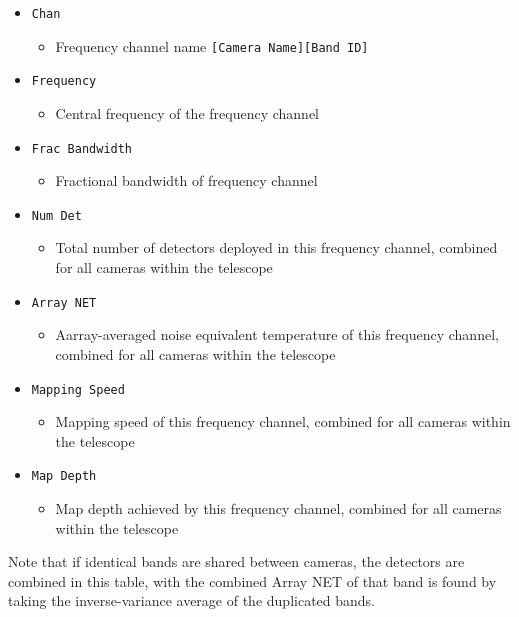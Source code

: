 \documentclass[11pt]{article} %
\begin{document}
\begin{itemize}[noitemsep,topsep=0pt]
	\item \texttt{Chan}
		\begin{itemize}[noitemsep,topsep=0pt]
		\item Frequency channel name \texttt{[Camera Name][Band ID]}
		\end{itemize}
	\item \texttt{Frequency}
		\begin{itemize}[noitemsep,topsep=0pt]
		\item Central frequency of the frequency channel
		\end{itemize}
	\item \texttt{Frac Bandwidth} 
		\begin{itemize}[noitemsep,topsep=0pt]
		\item Fractional bandwidth of frequency channel
		\end{itemize}
	\item \texttt{Num Det}
		\begin{itemize}[noitemsep,topsep=0pt]
		\item Total number of detectors deployed in this frequency channel, combined for all cameras within the telescope
		\end{itemize}
	\item \texttt{Array NET}
		\begin{itemize}[noitemsep,topsep=0pt]
		\item Aarray-averaged noise equivalent temperature of this frequency channel, combined for all cameras within the telescope
		\end{itemize}
	\item \texttt{Mapping Speed}
		\begin{itemize}[noitemsep,topsep=0pt]	
		\item Mapping speed of this frequency channel, combined for all cameras within the telescope
		\end{itemize}
	\item \texttt{Map Depth}
		\begin{itemize}[noitemsep,topsep=0pt]
		\item Map depth achieved by this frequency channel, combined for all cameras within the telescope
		\end{itemize}
\end{itemize}
Note that if identical bands are shared between cameras, the detectors are combined in this table, with the combined Array NET of that band is found by taking the inverse-variance average of the duplicated bands.
\end{document}
